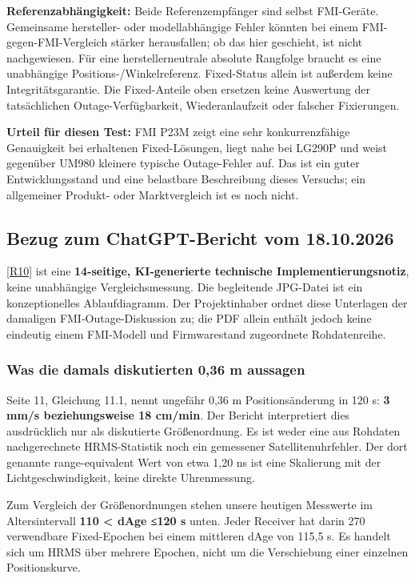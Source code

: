 \documentclass[11pt,a4paper]{article}
\numberwithin{equation}{section}
\numberwithin{figure}{section}
\begin{document}
\textbf{Referenzabhängigkeit:} Beide Referenzempfänger sind selbst FMI-Geräte. Gemeinsame hersteller- oder modellabhängige Fehler könnten bei einem FMI-gegen-FMI-Vergleich stärker herausfallen; ob das hier geschieht, ist nicht nachgewiesen. Für eine herstellerneutrale absolute Rangfolge braucht es eine unabhängige Positions-/\allowbreak{}Winkelreferenz. Fixed-Status allein ist außerdem keine Integritätsgarantie. Die Fixed-Anteile oben ersetzen keine Auswertung der tatsächlichen Outage-Verfügbarkeit, Wiederanlaufzeit oder falscher Fixierungen.

\textbf{Urteil für diesen Test:} FMI P23M zeigt eine sehr konkurrenzfähige Genauigkeit bei erhaltenen Fixed-Lösungen, liegt nahe bei LG290P und weist gegenüber UM980 kleinere typische Outage-Fehler auf. Das ist ein guter Entwicklungsstand und eine belastbare Beschreibung dieses Versuchs; ein allgemeiner Produkt- oder Marktvergleich ist es noch nicht.

\subsection{Bezug zum ChatGPT-Bericht vom 18.10.2026}

\hyperlink{ref-R10}{[R10]} ist eine \textbf{14-seitige, KI-generierte technische Implementierungsnotiz}, keine unabhängige Vergleichsmessung. Die begleitende JPG-Datei ist ein konzeptionelles Ablaufdiagramm. Der Projektinhaber ordnet diese Unterlagen der damaligen FMI-Outage-Diskussion zu; die PDF allein enthält jedoch keine eindeutig einem FMI-Modell und Firmwarestand zugeordnete Rohdatenreihe.

\subsubsection{Was die damals diskutierten 0,36 m aussagen}

Seite 11, Gleichung 11.1, nennt ungefähr 0,36 m Positionsänderung in 120 s: \textbf{3 mm/\allowbreak{}s beziehungsweise 18 cm/\allowbreak{}min}. Der Bericht interpretiert dies ausdrücklich nur als diskutierte Größenordnung. Es ist weder eine aus Rohdaten nachgerechnete HRMS-Statistik noch ein gemessener Satellitenuhrfehler. Der dort genannte range-equivalent Wert von etwa 1,20 ns ist eine Skalierung mit der Lichtgeschwindigkeit, keine direkte Uhrenmessung.

Zum Vergleich der Größenordnungen stehen unsere heutigen Messwerte im Altersintervall \textbf{110 < dAge ≤120 s} unten. Jeder Receiver hat darin 270 verwendbare Fixed-Epochen bei einem mittleren dAge von 115,5 s. Es handelt sich um HRMS über mehrere Epochen, nicht um die Verschiebung einer einzelnen Positionskurve.
\end{document}
